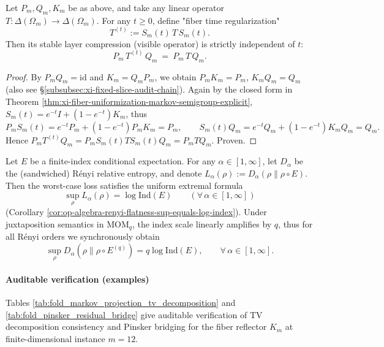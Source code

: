 \begin{proposition}\label{prop:xi-fiber-mixing-time-invisible-on-stable-compression}
Let \(P_m,Q_m,K_m\) be as above, and take any linear operator \(T:\Delta(\Omega_m)\to\Delta(\Omega_m)\).
For any \(t\ge 0\), define "fiber time regularization"
\[
T^{(t)}:=S_m(t)\,T\,S_m(t).
\]
Then its stable layer compression (visible operator) is strictly independent of \(t\):
\[
\boxed{\;
P_m\,T^{(t)}\,Q_m\ =\ P_m\,T\,Q_m.\;}
\]
\end{proposition}
\begin{proof}
By \(P_mQ_m=\mathrm{id}\) and \(K_m=Q_mP_m\), we obtain \(P_mK_m=P_m\), \(K_mQ_m=Q_m\) (also see \S\ref{subsubsec:xi-fixed-slice-audit-chain}).
Again by the closed form in Theorem \ref{thm:xi-fiber-uniformization-markov-semigroup-explicit},
\(
S_m(t)=e^{-t}I+(1-e^{-t})K_m
\),
thus
\[
P_mS_m(t)=e^{-t}P_m+(1-e^{-t})P_mK_m=P_m,
\qquad
S_m(t)Q_m=e^{-t}Q_m+(1-e^{-t})K_mQ_m=Q_m.
\]
Hence
\(
P_mT^{(t)}Q_m=P_mS_m(t)TS_m(t)Q_m=P_mTQ_m
\).
Proven.
\end{proof}

\begin{corollary}\label{cor:xi-renyi-flatness-under-momq-amplification}
Let \(E\) be a finite-index conditional expectation.
For any \(\alpha\in[1,\infty]\), let \(D_\alpha\) be the (sandwiched) Rényi relative entropy, and denote
\(
L_\alpha(\rho):=D_\alpha(\rho\|\rho\circ E)
\).
Then the worst-case loss satisfies the uniform extremal formula
\[
\sup_{\rho}L_\alpha(\rho)=\log\mathrm{Ind}(E)
\qquad(\forall\,\alpha\in[1,\infty])
\]
(Corollary \ref{cor:op-algebra-renyi-flatness-sup-equals-log-index}).
Under juxtaposition semantics in \(\mathrm{MOM}_q\), the index scale linearly amplifies by \(q\), thus for all Rényi orders we synchronously obtain
\[
\boxed{\;
\sup_{\rho}D_\alpha(\rho\|\rho\circ E^{(q)})=q\log\mathrm{Ind}(E),
\qquad \forall\,\alpha\in[1,\infty].\;}
\]
\end{corollary}

\paragraph{Auditable verification (examples)}
Tables \ref{tab:fold_markov_projection_tv_decomposition} and \ref{tab:fold_pinsker_residual_bridge} give auditable verification of TV decomposition consistency and Pinsker bridging for the fiber reflector \(K_m\) at finite-dimensional instance \(m=12\).


